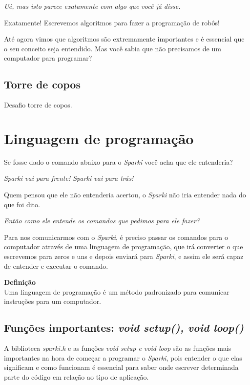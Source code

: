     \textit{Ué, mas isto parece exatamente com algo que você já disse.}  
    
    Exatamente! Escrevemos algoritmos para fazer a programação de robôs! \par 
    Até agora vimos que algoritmos são extremamente importantes e é essencial que o seu conceito seja entendido. Mas você sabia que não precisamos de um computador para programar?
\subsection{Torre de copos}
    Desafio torre de copos.


\section{Linguagem de programação}
    Se fosse dado o comando abaixo para o \textit{Sparki} você acha que ele entenderia? \par
    \begin{center}
    \textit{Sparki vai para frente! Sparki vai para trás!}\ \par
    \end{center} \par
    Quem pensou que ele não entenderia acertou, o \textit{Sparki} não iria entender nada do que foi dito. \par
    \textit{Então como ele entende os comandos que pedimos para ele fazer?}\par
    Para nos comunicarmos com o \textit{Sparki}, é preciso passar os comandos para o computador através de uma linguagem de programação, que irá converter o que escrevemos para zeros e uns e depois enviará para \textit{Sparki}, e assim ele será capaz de entender e executar o comando.
    
    \begin{center}
    \textbf{Definição} \\
    Uma linguagem de programação é um método padronizado para comunicar instruções para um computador.
    \end{center} \par
    
 
\subsection{Funções importantes: \textit{void setup(), void loop()}}
    
    A biblioteca  \textit{sparki.h} e as funções \textit{void setup e void loop} são as funções mais importantes na hora de começar a programar o \textit{Sparki}, pois entender o que elas significam e como funcionam é essencial para saber onde escrever determinada parte do código em relação ao tipo de aplicação.
    
